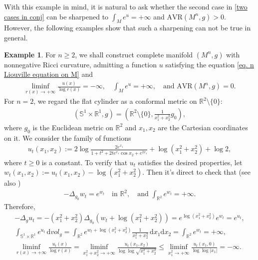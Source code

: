 \documentclass[12pt]{amsart}
\theoremstyle{plain}
\theoremstyle{definition}
\newtheorem{example}[theorem]{Example}
\theoremstyle{remark}     %
\begin{document}
With this example in mind, it is natural to ask whether the second case in \cref{two cases in conj} can be sharpened to $\int_M e^u=+\infty$ and $\mathrm{AVR}(M^n,g)>0$.
However,  the following examples show that such a sharpening can not be true in general.
\begin{example}\label{example mine}
    For $n\geq 2$, we shall construct complete manifold $(M^n,g)$ with nonnegative Ricci curvature, admitting a function $u$ satisfying the equation \cref{eq. n Liouville equation on M} and
    \begin{align*}
        \liminf_{r(x)\to+\infty}\frac{u(x)}{\log r(x)}=-\infty,\quad 
        \int_M e^u=+\infty,\quad 
        \text{and }
        \mathrm{AVR}(M^n,g)=0.
    \end{align*}
    For $n=2$, we regard the flat cylinder as a conformal metric on $\mathbb{R}^2\setminus\{0\}$:
    \begin{align*}
        \left(\mathbb{S}^1\times \mathbb{R}^1, g\right)
        =\left(\mathbb{R}^2\setminus\{0\},\frac{1}{x_1^2+x_2^2}g_0
        \right),
    \end{align*}
    where $g_0$ is the Euclidean metric on $\mathbb{R}^2$ and $x_1,x_2$ are the Cartesian coordinates on it. We consider the family of functions
    \begin{align}\label{solution on cylinder with infinite volume}
        u_t(x_1,x_2):=
        2\log \frac{2e^{x_1}}{1+t^2+2te^{x_1}\cos x_2+e^{2x_1}}
        +\log ({x_1^2+x_2^2})+\log 2,
    \end{align}
    where $t\geq 0$ is a constant. To verify that $u_t$ satisfies the desired properties, let $w_t(x_1,x_2):=u_t(x_1,x_2)
    -\log  ({x_1^2+x_2^2})$. Then it's direct to check that (see also \cite[Theorem 1.6]{EGLX25})
    \begin{align*}
        -\Delta_{g_0} w_t=e^{w_t} \quad 
        \text{in }\mathbb{R}^2,\quad 
        \text{and }\int_{\mathbb{R}^2}e^{w_t}=+\infty.
    \end{align*}
    Therefore, 
    \begin{align*}
        -\Delta_g u_t=-(x_1^2+x_2^2)\Delta_{g_0}(w_t+\log (x_1^2+x_2^2))
        =e^{\log (x_1^2+x_2^2)}e^{w_t}
        =e^{u_t},\\
        \int_{\mathbb{S}^1\times \mathbb{R}^1}e^{u_t}\,\text{d}vol_g
        =\int_{\mathbb{R}^2}
        e^{w_t+\log(x_1^2+x_2^2)}
        \frac{1}{x_1^2+x_2^2}
        \,\text{d}x_1\text{d}x_2
        =\int_{\mathbb{R}^2}e^{w_t}=+\infty,\\
        \liminf_{r(x)\to+\infty}
        \frac{u_t(x)}{\log r(x)}
        =\liminf_{x_1^2+x_2^2\to+\infty}
        \frac{u_t(x_1,x_2)}{\log\log\sqrt{x_1^2+x_2^2}}
        \leq \liminf_{x_1^2\to+\infty}
        \frac{u_t(x_1,0)}{\log \log |x_1|}
        =-\infty.
    \end{align*}


\end{example}
\end{document}
